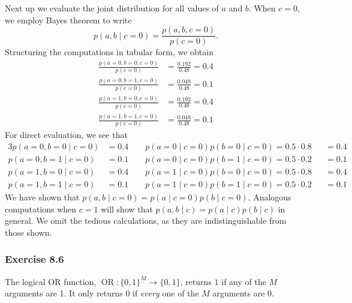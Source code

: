 \documentclass[12pt, a4paper]{article}
\begin{document}
Next up we evaluate the joint  distribution for all values of $a$ and $b$. 
When $c=0$, we employ Bayes theorem to write
\begin{equation*}
	p(a, b \mid c=0) = \frac{p(a, b, c=0)}{p(c=0)}.
\end{equation*}
Structuring the computations in tabular form, we obtain
\begin{align*}
	\frac{p(a=0, b=0, c=0)}{p(c=0)} &= \frac{0.192}{0.48} = 0.4 \\
	\frac{p(a=0, b=1, c=0)}{p(c=0)} &= \frac{0.048}{0.48} = 0.1 \\
	\frac{p(a=1, b=0, c=0)}{p(c=0)} &= \frac{0.192}{0.48} = 0.4 \\
	\frac{p(a=1, b=1, c=0)}{p(c=0)} &= \frac{0.048}{0.48} = 0.1 
\end{align*}
For direct evaluation, we see that 
\begin{alignat*}{3}
	p(a=0, b=0 \mid c= 0) &= 0.4 \qquad 
	p(a=0 \mid c= 0) p( b=0 \mid c= 0)  = 0.5 \cdot 0.8 &&= 0.4 \\
	p(a=0, b=1 \mid c= 0) &= 0.1 \qquad 
	p(a=0 \mid c= 0) p( b=1 \mid c= 0)  = 0.5 \cdot 0.2 &&= 0.1 \\
	p(a=1, b=0 \mid c= 0) &= 0.4 \qquad 
	p(a=1 \mid c= 0) p( b=0 \mid c= 0)  = 0.5 \cdot 0.8 &&= 0.4 \\
	p(a=1, b=1 \mid c= 0) &= 0.1 \qquad 
	p(a=1 \mid c= 0) p( b=1 \mid c= 0)  = 0.5 \cdot 0.2 &&= 0.1
\end{alignat*}
We have shown that $p(a, b \mid c=0) = p(a\mid c=0) p(b\mid c=0)$.
Analogous computations when $c=1$ will show that $p(a, b \mid c) = p(a\mid c) p(b\mid c)$ in general. 
We omit the tedious calculations, as they are indistinguishable from those shown. 




\subsubsection*{Exercise 8.6}
The logical OR function, $\operatorname{OR}: \{0,1\}^M \to \{0,1\}$, returns $1$ if any of the $M$ arguments are 1. 
It only returns $0$ if \emph{every} one of the $M$ arguments are $0$.
\end{document}
